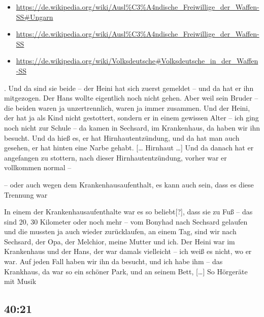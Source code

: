 \documentclass[ngerman,]{article}
\providecommand{\tightlist}{%
  \setlength{\itemsep}{0pt}\setlength{\parskip}{0pt}}
\begin{document}
\begin{multicols}{2}
\begin{description}
{  \begin{itemize}
  \tightlist
  \item
    \url{https://de.wikipedia.org/wiki/Ausl\%C3\%A4ndische_Freiwillige_der_Waffen-SS\#Ungarn}
  \item
    \url{https://de.wikipedia.org/wiki/Ausl\%C3\%A4ndische_Freiwillige_der_Waffen-SS}
  \item
    \url{https://de.wikipedia.org/wiki/Volksdeutsche\#Volksdeutsche_in_der_Waffen-SS}
  \end{itemize}}. Und da sind sie beide – der Heini hat sich zuerst
gemeldet – und da hat er ihn mitgezogen. Der Hans wollte eigentlich noch
nicht gehen. Aber weil sein Bruder – die beiden waren ja unzertrennlich,
waren ja immer zusammen. Und der Heini, der hat ja als Kind nicht
gestottert, sondern er in einem gewissen Alter – ich ging noch nicht zur
Schule – da kamen in Sechsard, im Krankenhaus, da haben wir ihn besucht.
Und da hieß es, er hat Hirnhautentzündung, und da hat man auch gesehen,
er hat hinten eine Narbe gehabt. {[}\ldots{} Hirnhaut \ldots{}{]} Und da
danach hat er angefangen zu stottern, nach dieser Hirnhautentzündung,
vorher war er vollkommen normal –
\end{description}

\begin{description}
\tightlist
\item[Ruth]
– oder auch wegen dem Krankenhausaufenthalt, es kann auch sein, dass es
diese Trennung war
\item[Käthe]
In einem der Krankenhausaufenthalte war es so beliebt{[}?{]}, dass sie
zu Fuß – das sind 20, 30 Kilometer oder noch mehr – vom Bonyhad nach
Sechsard gelaufen und die mussten ja auch wieder zurücklaufen, an einem
Tag, sind wir nach Sechsard, der Opa, der Melchior, meine Mutter und
ich. Der Heini war im Krankenhaus und der Hans, der war damals
vielleicht – ich weiß es nicht, wo er war. Auf jeden Fall haben wir ihn
da besucht, und ich habe ihm – das Krankhaus, da war so ein schöner
Park, und an seinem Bett, {[}\ldots{}{]} So Hörgeräte mit Musik
\end{description}

\hypertarget{section-2}{%
\subsection{40:21}\label{section-2}}


\end{multicols}
\end{document}
